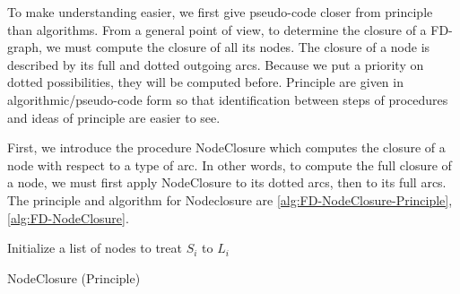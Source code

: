 \noindent To make understanding easier, we first give pseudo-code closer from
principle than algorithms. From a general point of view, to determine the 
closure of a FD-graph, we must compute the closure of all its nodes. The 
closure of a node is described by its full and dotted outgoing arcs. Because we
put a priority on dotted possibilities, they will be computed before. Principle
are given in algorithmic/pseudo-code form so that identification between steps
of procedures and ideas of principle are easier to see.

\vspace{1.2em}

First, we introduce the procedure NodeClosure which computes the closure of a
node with respect to a type of arc. In other words, to compute the full closure
of a node, we must first apply NodeClosure to its dotted arcs, then to its full
arcs. The principle and algorithm for Nodeclosure are 
\ref{alg:FD-NodeClosure-Principle}, \ref{alg:FD-NodeClosure}. 

\vspace{1.2em}

\begin{algorithm}

\BlankLine
\BlankLine

Initialize a list of nodes to treat $S_i$ to $L_i$ \;


\caption{NodeClosure (Principle)}
\label{alg:FD-NodeClosure-Principle}
\end{algorithm}

